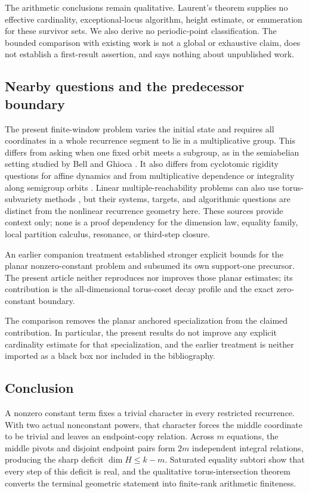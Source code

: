 \documentclass[11pt]{article}
\theoremstyle{definition}
\theoremstyle{remark}
\begin{document}
The arithmetic conclusions remain qualitative.  Laurent's theorem supplies no effective cardinality, exceptional-locus algorithm, height estimate, or enumeration for these survivor sets.  We also derive no periodic-point classification.  The bounded comparison with existing work is not a global or exhaustive claim, does not establish a first-result assertion, and says nothing about unpublished work.

\subsection{Nearby questions and the predecessor boundary}

The present finite-window problem varies the initial state and requires all coordinates in a whole recurrence segment to lie in a multiplicative group.  This differs from asking when one fixed orbit meets a subgroup, as in the semiabelian setting studied by Bell and Ghioca \cite{BellGhioca2024}.  It also differs from cyclotomic rigidity questions for affine dynamics \cite{JiXieZhang2026} and from multiplicative dependence or integrality along semigroup orbits \cite{MelloYasufuku2026}.  Linear multiple-reachability problems can also use torus-subvariety methods \cite{KarimovKelmendiOuaknineWorrell2024}, but their systems, targets, and algorithmic questions are distinct from the nonlinear recurrence geometry here.  These sources provide context only; none is a proof dependency for the dimension law, equality family, local partition calculus, resonance, or third-step closure.

An earlier companion treatment established stronger explicit bounds for the planar nonzero-constant problem and subsumed its own support-one precursor. The present article neither reproduces nor improves those planar estimates; its contribution is the all-dimensional torus-coset decay profile and the exact zero-constant boundary.

The comparison removes the planar anchored specialization from the claimed contribution.  In particular, the present results do not improve any explicit cardinality estimate for that specialization, and the earlier treatment is neither imported as a black box nor included in the bibliography.

\subsection{Conclusion}

A nonzero constant term fixes a trivial character in every restricted recurrence.  With two actual nonconstant powers, that character forces the middle coordinate to be trivial and leaves an endpoint-copy relation.  Across $m$ equations, the middle pivots and disjoint endpoint pairs form $2m$ independent integral relations, producing the sharp deficit $\dim H\leq k-m$.  Saturated equality subtori show that every step of this deficit is real, and the qualitative torus-intersection theorem converts the terminal geometric statement into finite-rank arithmetic finiteness.
\end{document}
